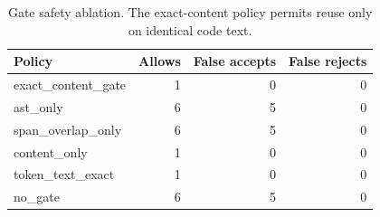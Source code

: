 \begin{table}[t]
\centering
\caption{Gate safety ablation. The exact-content policy permits reuse only on identical code text.}
\label{tab:safety}
\begin{tabular}{lrrr}
\toprule
Policy & Allows & False accepts & False rejects \\
\midrule
exact\_content\_gate & 1 & 0 & 0 \\
ast\_only & 6 & 5 & 0 \\
span\_overlap\_only & 6 & 5 & 0 \\
content\_only & 1 & 0 & 0 \\
token\_text\_exact & 1 & 0 & 0 \\
no\_gate & 6 & 5 & 0 \\
\bottomrule
\end{tabular}
\end{table}
